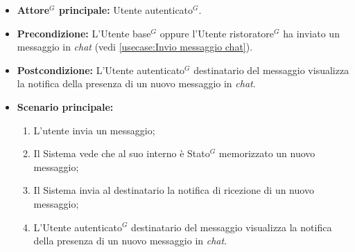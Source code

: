 \label{usecase:Visualizzazione notifica nuovo messaggio in chat}
\begin{itemize}
    \item \textbf{\gls{Attore}$^G$ principale:} \gls{Utente autenticato}$^G$.
	
	\item \textbf{Precondizione:} L'\gls{Utente base}$^G$ oppure l'\gls{Utente ristoratore}$^G$ ha inviato un messaggio in \textit{chat} (vedi \autoref{usecase:Invio messaggio chat}).

	\item \textbf{Postcondizione:} L'\gls{Utente autenticato}$^G$ destinatario del messaggio visualizza la notifica della presenza di un nuovo messaggio in \textit{chat}.
     
	\item \textbf{Scenario principale:}
	      \begin{enumerate}
                \item L'utente invia un messaggio;
                \item Il Sistema vede che al suo interno è \gls{Stato}$^G$ memorizzato un nuovo messaggio;
                \item Il Sistema invia al destinatario la notifica di ricezione di un nuovo messaggio;
                \item L'\gls{Utente autenticato}$^G$ destinatario del messaggio visualizza la notifica della presenza di un nuovo messaggio in \textit{chat}.
	      \end{enumerate}
\end{itemize}